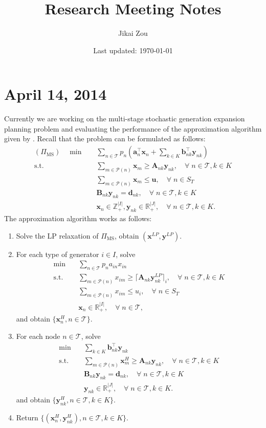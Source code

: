 \documentclass[10pt]{article}
\theoremstyle{plain}
\theoremstyle{definition}
\theoremstyle{remark}
\newcommand{\mb}{\mathbf}
\newcommand{\tr}{^{\top}}
\newcommand{\subjectto}{\text{s.t.}}
\newcommand{\bA}{\mathbf{A}}
\newcommand{\bB}{\mathbf{B}}
\newcommand{\ba}{\mathbf{a}}
\newcommand{\bb}{\mathbf{b}}
\newcommand{\bx}{\mathbf{x}}
\newcommand{\by}{\mathbf{y}}
\newcommand{\bu}{\mathbf{u}}
\newcommand{\cP}{\mathcal{P}}
\newcommand{\T}{\mathcal{T}}
\newcommand{\Z}{\mathbb{Z}}
\newcommand{\R}{\mathbb{R}}
\begin{document}
\title{Research Meeting Notes}

\author{Jikai Zou}

\date{Last updated: \today}

\maketitle

\section*{April 14, 2014}
Currently we are working on the multi-stage stochastic generation expansion planning
problem and evaluating the performance of the approximation algorithm given by \cite{HA2009}.
Recall that the problem can be formulated as follows:
\begin{align*}
(\Pi_{\text{MS}}) \quad \min \quad & \sum_{n\in \T} p_n(\ba_n\tr \bx_n + \sum_{k\in K}\bb_{nk}\tr \by_{nk})\\
\subjectto \quad & \sum_{m\in\cP(n)} \bx_m \ge \bA_{nk}\by_{nk}, \quad \forall\; n\in \T, k\in K\\
& \sum_{m\in\cP(n)} \bx_m \le \bu, \quad \forall\; n \in S_T\\
& \bB_{nk}\by_{nk} = \mb{d}_{nk}, \quad \forall\; n\in \T, k\in K\\
& \bx_n\in \Z_+^{|I|}, \by_{nk}\in \R_+^{|J|}, \quad \forall\; n\in \T, k\in K.
\end{align*}
The approximation algorithm works as follows:
\begin{enumerate}
\item Solve the LP relaxation of $\Pi_{\text{MS}}$, obtain $(\bx^{LP},\by^{LP})$.
\item For each type of generator $i\in I$, solve
\begin{align*}
\min \quad & \sum_{n\in \T} p_na_{in}x_{in}\\
\subjectto \quad & \sum_{m\in\cP(n)} x_{im} \ge \lceil\bA_{nk}\by^{LP}_{nk}\rceil_i, \quad \forall\; n\in \T, k\in K\\
& \sum_{m\in\cP(n)} x_{im} \le u_i, \quad \forall\; n \in S_T\\
& \bx_n\in \R_+^{|I|}, \quad \forall\; n\in \T,
\end{align*}
and obtain $\{\bx_n^H, n\in \T\}$.
\item For each node $n\in \T$, solve
\begin{align*}
\min \quad & \sum_{k\in K}\bb_{nk}\tr \by_{nk}\\
\subjectto \quad & \sum_{m\in\cP(n)} \bx^{H}_m \ge \bA_{nk}\by_{nk}, \quad \forall\; n\in \T, k\in K\\
& \bB_{nk}\by_{nk} = \mb{d}_{nk}, \quad \forall\; n\in \T, k\in K\\
& \by_{nk}\in \R_+^{|J|}, \quad \forall\; n\in \T, k\in K.
\end{align*}
and obtain $\{\by_{nk}^H, n\in \T, k\in K\}$.
\item Return $\{(\bx_n^H, \by_{nk}^H), n\in \T, k\in K\}$.
\end{enumerate}
\end{document}
